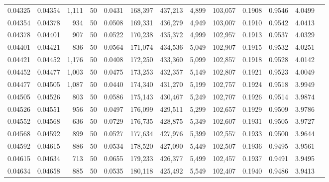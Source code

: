 \begin{tabular}{rrrrrrrrrrrrr}
0.04325 & 0.04354 & 1,111 &  50 &                                     0.0431 & 168,397 & 437,213 &   4,899 & 103,057 & 0.1908 & 0.9546 & 4.0499 \\
0.04354 & 0.04378 &   934 &  50 &                                     0.0508 & 169,331 & 436,279 &   4,949 & 103,007 & 0.1910 & 0.9542 & 4.0413 \\
0.04378 & 0.04401 &   907 &  50 &                                     0.0522 & 170,238 & 435,372 &   4,999 & 102,957 & 0.1913 & 0.9537 & 4.0329 \\
0.04401 & 0.04421 &   836 &  50 &                                     0.0564 & 171,074 & 434,536 &   5,049 & 102,907 & 0.1915 & 0.9532 & 4.0251 \\
0.04421 & 0.04452 & 1,176 &  50 &                                     0.0408 & 172,250 & 433,360 &   5,099 & 102,857 & 0.1918 & 0.9528 & 4.0142 \\
0.04452 & 0.04477 & 1,003 &  50 &                                     0.0475 & 173,253 & 432,357 &   5,149 & 102,807 & 0.1921 & 0.9523 & 4.0049 \\
0.04477 & 0.04505 & 1,087 &  50 &                                     0.0440 & 174,340 & 431,270 &   5,199 & 102,757 & 0.1924 & 0.9518 & 3.9949 \\
0.04505 & 0.04526 &   803 &  50 &                                     0.0586 & 175,143 & 430,467 &   5,249 & 102,707 & 0.1926 & 0.9514 & 3.9874 \\
0.04526 & 0.04551 &   956 &  50 &                                     0.0497 & 176,099 & 429,511 &   5,299 & 102,657 & 0.1929 & 0.9509 & 3.9786 \\
0.04552 & 0.04568 &   636 &  50 &                                     0.0729 & 176,735 & 428,875 &   5,349 & 102,607 & 0.1931 & 0.9505 & 3.9727 \\
0.04568 & 0.04592 &   899 &  50 &                                     0.0527 & 177,634 & 427,976 &   5,399 & 102,557 & 0.1933 & 0.9500 & 3.9644 \\
0.04592 & 0.04615 &   886 &  50 &                                     0.0534 & 178,520 & 427,090 &   5,449 & 102,507 & 0.1936 & 0.9495 & 3.9561 \\
0.04615 & 0.04634 &   713 &  50 &                                     0.0655 & 179,233 & 426,377 &   5,499 & 102,457 & 0.1937 & 0.9491 & 3.9495 \\
0.04634 & 0.04658 &   885 &  50 &                                     0.0535 & 180,118 & 425,492 &   5,549 & 102,407 & 0.1940 & 0.9486 & 3.9413 \\

\end{tabular}
